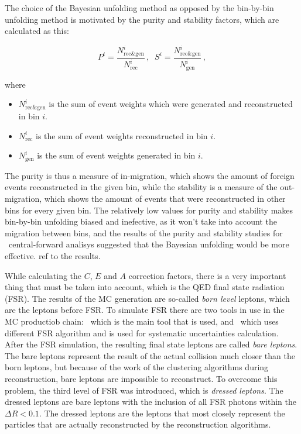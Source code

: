 The choice of the Bayesian unfolding method as opposed by the bin-by-bin unfolding method is motivated by the purity and stability factors, which are calculated as this:

\begin{equation}
P^{i} = \frac{N^{i}_{\text{rec\&gen}} }{ N^{i}_{\text{rec}} }\,, \; \;
S^{i} = \frac{N^{i}_{\text{rec\&gen}} }{ N^{i}_{\text{gen}} }\,,
\end{equation}

where
\begin{itemize}
\item {\bfseries $N^i_{\text{rec\&gen}}$} is the sum of event weights which were generated and reconstructed in bin $i$.
\item {\bfseries $N^i_{\text{rec}}$} is the sum of event weights reconstructed in bin $i$.
\item {\bfseries $N^i_{\text{gen}}$} is the sum of event weights generated in bin $i$.
\end{itemize}

The purity is thus a measure of in-migration, which shows the amount of foreign events reconstructed in the given bin, while the stability is a measure of the out-migration, which shows the amount of events that were reconstructed in other bins for every given bin. The relatively low values for purity and stability makes bin-by-bin unfolding biased and inefective, as it won't take into account the migration between bins, and the results of the purity and stability studies for \Zee\ central-forward analisys suggested that the Bayesian unfolding would be more effective. \tbu ref to the results.

While calculating the $C$, $E$ and $A$ correction factors, there is a very important thing that must be taken into account, which is the QED final state radiation (FSR). The results of the MC generation are so-called {\itshape born level} leptons, which are the leptons before FSR. To simulate FSR there are two tools in use in the MC productiob chain: \Photos\, which is the main tool that is used, and \Sherpa\ which uses different FSR algorithm and is used for systematic uncertainties calculation. After the FSR simulation, the resulting final state leptons are called {\itshape bare leptons}. The bare leptons represent the result of the actual collision much closer than the born leptons, but because of the work of the clustering algorithms during reconstruction, bare leptons are impossible to reconstruct. To overcome this problem, the third level of FSR was introduced, which is {\itshape dressed leptons}. The dressed leptons are bare leptons with the inclusion of all FSR photons within the $\Delta R < 0.1$. The dressed leptons are the leptons that most closely represent the particles that are actually reconstructed by the reconstruction algorithms.

